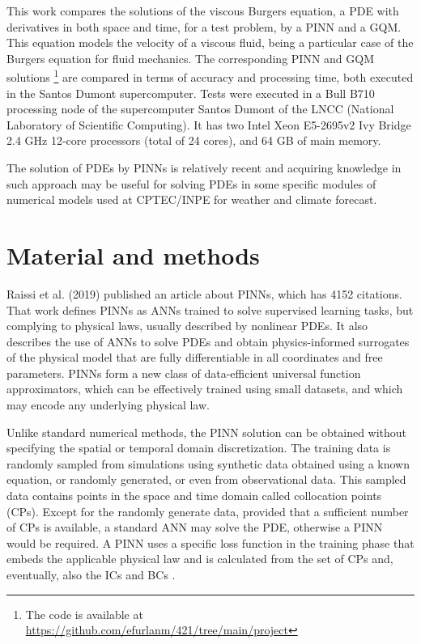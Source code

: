 \documentclass[conference]{IEEEtran}
\begin{document}
This work compares the solutions of the viscous Burgers equation, a PDE with derivatives in both space and time, for a test problem, by a PINN and a GQM. This equation models the velocity of a viscous fluid, being a particular case of the Burgers equation for fluid mechanics. The corresponding PINN and GQM solutions%
\footnote{The code is available at \url{https://github.com/efurlanm/421/tree/main/project}}
are compared in terms of accuracy and processing time, both executed in the Santos Dumont supercomputer. Tests were executed in a Bull B710 processing node of the supercomputer Santos Dumont of the LNCC (National Laboratory of Scientific Computing). It has two Intel Xeon E5-2695v2 Ivy Bridge 2.4 GHz 12-core processors (total of 24 cores), and 64 GB of main memory.

The solution of PDEs by PINNs is relatively recent and acquiring knowledge in such approach may be useful for solving PDEs in some specific modules of numerical models used at CPTEC/INPE for weather and climate forecast. 
%
\section{Material and methods}\label{sec:meth}
%
Raissi et al. (2019) \cite{Raissi2019} published an article about PINNs, which has 4152 citations. That work defines PINNs as ANNs trained to solve supervised learning tasks, but complying to physical laws, usually described by nonlinear PDEs. It also describes the use of ANNs to solve PDEs and obtain physics-informed surrogates of the physical model that are fully differentiable in all coordinates and free parameters. PINNs form a new class of data-efficient universal function approximators, which can be effectively trained using small datasets, and which may encode any underlying physical law. 

Unlike standard numerical methods, the PINN solution can be obtained without specifying the spatial or temporal domain discretization. The training data is randomly sampled from simulations using synthetic data obtained using a known equation, or randomly generated, or even from observational data. This sampled data contains points in the space and time domain called collocation points (CPs). Except for the randomly generate data, provided that a sufficient number of CPs is available, a standard ANN may solve the PDE, otherwise a PINN would be required. A PINN uses a specific loss function in the training phase that embeds the applicable physical law and is calculated from the set of CPs and, eventually, also the ICs and BCs \cite{Cuomo2022}.
\end{document}
